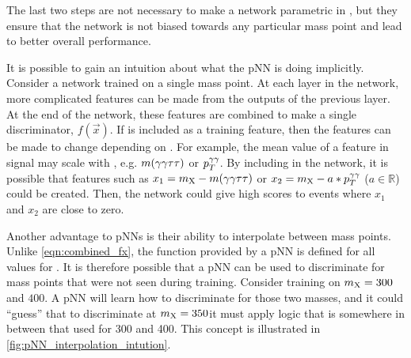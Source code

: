 The last two steps are not necessary to make a network parametric in \mX, but they ensure that the network is not biased towards any particular mass point and lead to better overall performance.

It is possible to gain an intuition about what the pNN is doing implicitly. Consider a network trained on a single mass point. At each layer in the network, more complicated features can be made from the outputs of the previous layer. At the end of the network, these features are combined to make a single discriminator, $f(\vec{x})$. If \mX is included as a training feature, then the features can be made to change depending on \mX. For example, the mean value of a feature in signal may scale with \mX, e.g. $m(\gamma\gamma\tau\tau)$ or $p_T^{\gamma\gamma}$. By including \mX in the network, it is possible that features such as $x_1= m_{\mathrm{X}} - m(\gamma\gamma\tau\tau)$ or $x_2 = m_{\mathrm{X}} - a*p_T^{\gamma\gamma}$ ($a \in \mathbb{R}$) could be created. Then, the network could give high scores to events where $x_1$ and $x_2$ are close to zero.

Another advantage to pNNs is their ability to interpolate between mass points. Unlike \cref{eqn:combined_fx}, the function provided by a pNN is defined for all values for \mX. It is therefore possible that a pNN can be used to discriminate for mass points that were not seen during training. Consider training on $m_{\mathrm{X}}=300$ and $400$\GeV. A pNN will learn how to discriminate for those two masses, and it could ``guess'' that to discriminate at $m_{\mathrm{X}}=350$\GeV it must apply logic that is somewhere in between that used for 300 and 400\GeV. This concept is illustrated in \cref{fig:pNN_interpolation_intution}.

